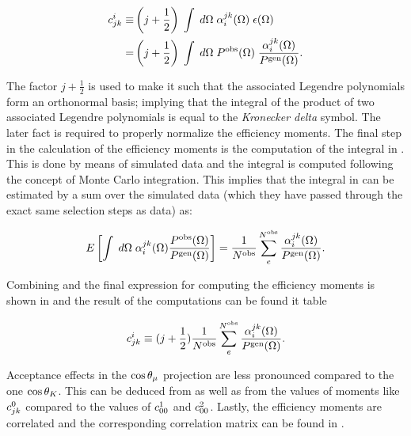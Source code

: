 \begin{align}
  \centering
   c^i_{jk}  \equiv & \parenthesis{j + \frac{1}{2}} \; \int \; d\Omega \; \effbase \; \epsilon(\Omega) \nonumber \\
                 =  & \parenthesis{j + \frac{1}{2}} \; \int \; d\Omega \; \Pobs \; \frac{\effbase}{\Pgen}.
  \label{eff_moms_def}
\end{align}

\noindent The factor $j+\frac{1}{2}$ is used to make it such that the associated Legendre polynomials form an
orthonormal basis; implying that the integral of the product of two associated Legendre polynomials is equal
to the {\it Kronecker delta} symbol. The later fact is required to properly normalize the efficiency moments.
The final step in the calculation of the efficiency moments is the computation of the integral in .
This is done by means of simulated data and the integral is computed following the concept of Monte Carlo integration.
This implies that the integral in  can be estimated by a sum over the simulated data
(which they have passed through the exact same selection steps as data) as:

\begin{equation}
\centering
  E\left[ \int \; d\Omega \; \effbase \frac{\Pobs}{\Pgen} \right] = \frac{1}{\Nobs} \sum_e^{\Nobs} \frac{\effbase}{\Pgen}.
  \label{eff_moms_calc}
\end{equation}

\noindent Combining  and  the final expression for computing the efficiency moments is shown
in  and the result of the computations can be found it table 

\begin{equation}
\centering
 c^i_{jk} \equiv (j + \frac{1}{2})  \frac{1}{\Nobs} \sum_e^{\Nobs} \frac{\effbase}{\Pgen}.
  \label{eff_moms_calc_final}
\end{equation}

\noindent Acceptance effects in the $\cos\theta_{\mu}$ projection are less pronounced compared to the one $\cos\theta_{K}$.
This can be deduced from  as well as from the values of moments like $c^{0}_{jk}$
compared to the values of $c^{1}_{00}$ and $c^{2}_{00}$. Lastly, the efficiency moments are
correlated and the corresponding correlation matrix can be found in .

